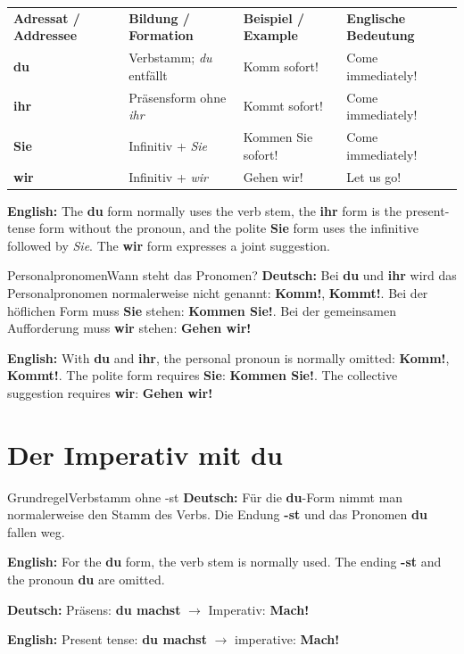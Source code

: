 \documentclass[a4paper,11pt]{article}
\newcommand{\GermanText}[1]{\textbf{Deutsch: }#1\par}
\newcommand{\EnglishText}[1]{{\small\color{SoftGray}\textbf{English: }#1\par}}
\newcommand{\TableEnglish}[1]{{\small\color{SoftGray}\textbf{English: }#1\par}}
\begin{document}
        \begin{longtable}{>{\bfseries}p{2.7cm}|p{3.4cm}|p{4cm}|p{4.5cm}}
            \rowcolor{HeaderBlueDark}
            \color{white}\textbf{Adressat / Addressee} &
            \color{white}\textbf{Bildung / Formation} &
            \color{white}\textbf{Beispiel / Example} &
            \color{white}\textbf{Englische Bedeutung} \\
            du & Verbstamm; \textit{du} entfällt & Komm sofort! & Come immediately! \\
            ihr & Präsensform ohne \textit{ihr} & Kommt sofort! & Come immediately! \\
            Sie & Infinitiv + \textit{Sie} & Kommen Sie sofort! & Come immediately! \\
            wir & Infinitiv + \textit{wir} & Gehen wir! & Let us go! \\
        \end{longtable}
        \TableEnglish{The \textbf{du} form normally uses the verb stem, the \textbf{ihr} form is the present-tense form without the pronoun, and the polite \textbf{Sie} form uses the infinitive followed by \textit{Sie}. The \textbf{wir} form expresses a joint suggestion.}

        \begin{grammarentry}{Personalpronomen}{Wann steht das Pronomen?}
            \GermanText{Bei \textbf{du} und \textbf{ihr} wird das Personalpronomen normalerweise nicht genannt: \textbf{Komm!}, \textbf{Kommt!}. Bei der höflichen Form muss \textbf{Sie} stehen: \textbf{Kommen Sie!}. Bei der gemeinsamen Aufforderung muss \textbf{wir} stehen: \textbf{Gehen wir!}}
            \EnglishText{With \textbf{du} and \textbf{ihr}, the personal pronoun is normally omitted: \textbf{Komm!}, \textbf{Kommt!}. The polite form requires \textbf{Sie}: \textbf{Kommen Sie!}. The collective suggestion requires \textbf{wir}: \textbf{Gehen wir!}}
        \end{grammarentry}

    \section{Der Imperativ mit du}

        \begin{grammarentry}{Grundregel}{Verbstamm ohne -st}
            \GermanText{Für die \textbf{du}-Form nimmt man normalerweise den Stamm des Verbs. Die Endung \textbf{-st} und das Pronomen \textbf{du} fallen weg.}
            \EnglishText{For the \textbf{du} form, the verb stem is normally used. The ending \textbf{-st} and the pronoun \textbf{du} are omitted.}

            \GermanText{Präsens: \textbf{du machst} $\rightarrow$ Imperativ: \textbf{Mach!}}
            \EnglishText{Present tense: \textbf{du machst} $\rightarrow$ imperative: \textbf{Mach!}}
        \end{grammarentry}
\end{document}
